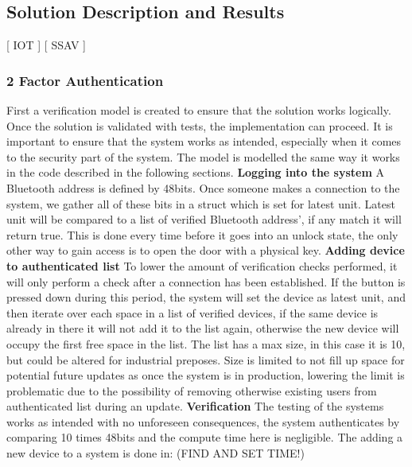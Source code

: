 \subsection{Solution Description and Results}
[ IOT ] [ SSAV ]
\newline
\subsubsection{2 Factor Authentication}
First a verification model is created to ensure that the solution works logically. Once the solution is validated with tests, the implementation can proceed. It is important to ensure that the system works as intended, especially when it comes to the security part of the system. The model is modelled the same way it works in the code described in the following sections.
\newline
\textbf{Logging into the system}\newline
A Bluetooth address is defined by 48bits\cite{BluetoothBeacon}. Once someone makes a connection to the system, we gather all of these bits in a struct which is set for latest unit. Latest unit will be compared to a list of verified Bluetooth address', if any match it will return true. This is done every time before it goes into an unlock state, the only other way to gain access is to open the door with a physical key.
\newline
\textbf{Adding device to authenticated list}\newline
To lower the amount of verification checks performed, it will only perform a check after a connection has been established. If the button is pressed down during this period, the system will set the device as latest unit, and then iterate over each space in a list of verified devices, if the same device is already in there it will not add it to the list again, otherwise the new device will occupy the first free space in the list. The list has a max size, in this case it is 10, but could be altered for industrial preposes. Size is limited to not fill up space for potential future updates as once the system is in production, lowering the limit is problematic due to the possibility of removing otherwise existing users from authenticated list during an update.
\newline
\textbf{Verification}\newline
The testing of the systems works as intended with no unforeseen consequences, the system authenticates by comparing 10 times 48bits and the compute time here is negligible. The adding a new device to a system is done in: (FIND AND SET TIME!)

